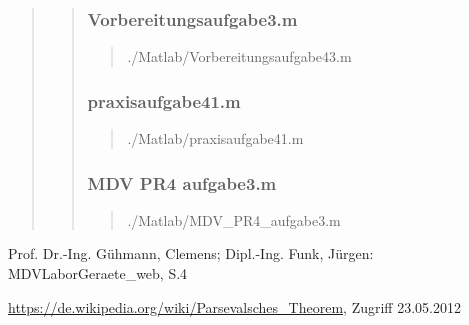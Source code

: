 \begin{quote}
\begin{quote}
		\subsubsection{Vorbereitungsaufgabe3.m}
		\begin{quote}
		
                {./Matlab/Vorbereitungsaufgabe43.m}		
		\end{quote}
		
		\subsubsection{praxisaufgabe41.m}
        \begin{quote}
        
                {./Matlab/praxisaufgabe41.m}     
        \end{quote}
        
        \subsubsection{MDV PR4 aufgabe3.m}
        \begin{quote}
        
                {./Matlab/MDV_PR4_aufgabe3.m}     
        \end{quote}
		
	\end{quote}
\end{quote}





\begin{thebibliography}{999}
 Prof. Dr.-Ing. Gühmann, Clemens; Dipl.-Ing. Funk, Jürgen: MDVLaborGeraete_web, S.4

 \url{https://de.wikipedia.org/wiki/Parsevalsches_Theorem}, Zugriff
23.05.2012
\end{thebibliography}






